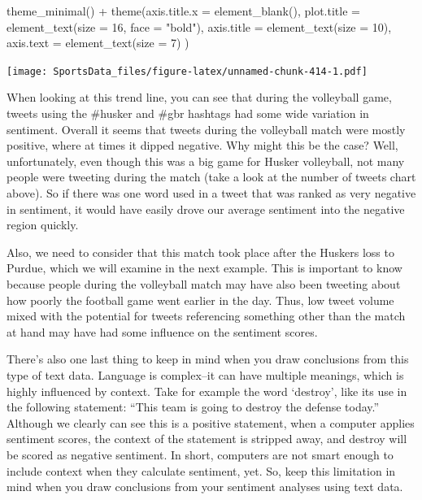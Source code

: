 \documentclass[
]{book}
\newenvironment{Shaded}{\begin{snugshade}}{\end{snugshade}}
\newcommand{\AttributeTok}[1]{\textcolor[rgb]{0.77,0.63,0.00}{#1}}
\newcommand{\DecValTok}[1]{\textcolor[rgb]{0.00,0.00,0.81}{#1}}
\newcommand{\FunctionTok}[1]{\textcolor[rgb]{0.00,0.00,0.00}{#1}}
\newcommand{\NormalTok}[1]{#1}
\newcommand{\SpecialCharTok}[1]{\textcolor[rgb]{0.00,0.00,0.00}{#1}}
\newcommand{\StringTok}[1]{\textcolor[rgb]{0.31,0.60,0.02}{#1}}
\begin{document}
\begin{Shaded}
\begin{Highlighting}[]
  \FunctionTok{theme\_minimal}\NormalTok{() }\SpecialCharTok{+}
  \FunctionTok{theme}\NormalTok{(}\AttributeTok{axis.title.x =} \FunctionTok{element\_blank}\NormalTok{(),}
        \AttributeTok{plot.title =} \FunctionTok{element\_text}\NormalTok{(}\AttributeTok{size =} \DecValTok{16}\NormalTok{, }\AttributeTok{face =} \StringTok{"bold"}\NormalTok{),}
    \AttributeTok{axis.title =} \FunctionTok{element\_text}\NormalTok{(}\AttributeTok{size =} \DecValTok{10}\NormalTok{),}
    \AttributeTok{axis.text =} \FunctionTok{element\_text}\NormalTok{(}\AttributeTok{size =} \DecValTok{7}\NormalTok{)}
\NormalTok{        )}
\end{Highlighting}
\end{Shaded}

\texttt{[image: SportsData\_files/figure-latex/unnamed-chunk-414-1.pdf]}

When looking at this trend line, you can see that during the volleyball game, tweets using the \#husker and \#gbr hashtags had some wide variation in sentiment. Overall it seems that tweets during the volleyball match were mostly positive, where at times it dipped negative. Why might this be the case? Well, unfortunately, even though this was a big game for Husker volleyball, not many people were tweeting during the match (take a look at the number of tweets chart above). So if there was one word used in a tweet that was ranked as very negative in sentiment, it would have easily drove our average sentiment into the negative region quickly.

Also, we need to consider that this match took place after the Huskers loss to Purdue, which we will examine in the next example. This is important to know because people during the volleyball match may have also been tweeting about how poorly the football game went earlier in the day. Thus, low tweet volume mixed with the potential for tweets referencing something other than the match at hand may have had some influence on the sentiment scores.

There's also one last thing to keep in mind when you draw conclusions from this type of text data. Language is complex--it can have multiple meanings, which is highly influenced by context. Take for example the word `destroy', like its use in the following statement: ``This team is going to destroy the defense today.'' Although we clearly can see this is a positive statement, when a computer applies sentiment scores, the context of the statement is stripped away, and destroy will be scored as negative sentiment. In short, computers are not smart enough to include context when they calculate sentiment, yet. So, keep this limitation in mind when you draw conclusions from your sentiment analyses using text data.
\end{document}
